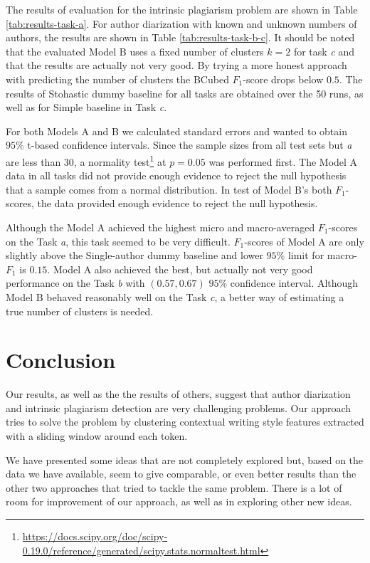 \documentclass[10pt, a4paper]{article}
\begin{document}
The results of evaluation for the intrinsic plagiarism problem are shown in Table \ref{tab:results-task-a}. For author diarization with known and unknown numbers of authors, the results are shown in Table \ref{tab:results-task-b-c}. It should be noted that the evaluated Model B uses a fixed number of clusters $k=2$ for task \emph{c} and that the results are actually not very good. By trying a more honest approach with predicting the number of clusters the BCubed $F_1$-score drops below $0.5$. The results of Stohastic dummy baseline for all tasks are obtained over the 50 runs, as well as for Simple baseline in Task \emph{c}.

For both Models A and B we calculated standard errors and wanted to obtain $95\%$ t-based confidence intervals. Since the sample sizes from all test sets but \emph{a} are less than $30$, a normality test\footnote{\url{https://docs.scipy.org/doc/scipy-0.19.0/reference/generated/scipy.stats.normaltest.html}} at $p=0.05$ was performed first. The Model A data in all tasks did not provide enough evidence to reject the null hypothesis that a sample comes from a normal distribution. In test of Model B's both $F_1$-scores, the data provided enough evidence to reject the null hypothesis.

Although the Model A achieved the highest micro and macro-averaged $F_1$-scores on the Task \emph{a}, this task seemed to be very difficult. $F_1$-scores of Model A are only slightly above the Single-author dummy baseline and lower $95\%$ limit for macro-$F_1$ is $0.15$. Model A also achieved the best, but actually not very good performance on the Task \emph{b} with $(0.57, 0.67)$ $95\%$ confidence interval. Although Model B behaved reasonably well on the Task \emph{c}, a better way of estimating a true number of clusters is needed.


\section{Conclusion}

Our results, as well as the the results of others, suggest that author diarization and intrinsic plagiarism detection are very challenging problems. Our approach tries to solve the problem by clustering contextual writing style features extracted with a sliding window around each token. 

We have presented some ideas that are not completely explored but, based on the data we have available, seem to give comparable, or even better results than the other two approaches that tried to tackle the same problem. There is a lot of room for improvement of our approach, as well as in exploring other new ideas.
\end{document}
